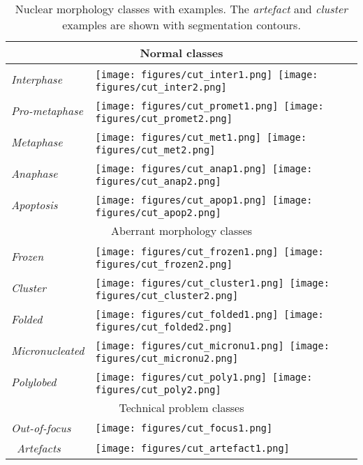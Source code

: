 \begin{table}[!ht]
\caption{Nuclear morphology classes with examples. The \textit{artefact} and \textit{cluster} examples are shown with segmentation contours.}
\label{classexamples}
\begin{tabular}{|ll|}
\hline
\multicolumn{2}{c}{Normal classes}\\
\hline
\textit{Interphase}&\texttt{[image: figures/cut\_inter1.png]}\ \texttt{[image: figures/cut\_inter2.png]}\\
\textit{Pro-metaphase}&\texttt{[image: figures/cut\_promet1.png]}\ \texttt{[image: figures/cut\_promet2.png]}\\
\textit{Metaphase}&\texttt{[image: figures/cut\_met1.png]}\ \texttt{[image: figures/cut\_met2.png]}\\
\textit{Anaphase}&\texttt{[image: figures/cut\_anap1.png]}\ \texttt{[image: figures/cut\_anap2.png]}\\
\textit{Apoptosis}&\texttt{[image: figures/cut\_apop1.png]}\ \texttt{[image: figures/cut\_apop2.png]}\\
\hline
\multicolumn{2}{c}{Aberrant morphology classes}\\
\hline
\textit{Frozen}&\texttt{[image: figures/cut\_frozen1.png]}\ \texttt{[image: figures/cut\_frozen2.png]}\\
\textit{Cluster}&\texttt{[image: figures/cut\_cluster1.png]}\ \texttt{[image: figures/cut\_cluster2.png]}\\
\textit{Folded}&\texttt{[image: figures/cut\_folded1.png]}\ \texttt{[image: figures/cut\_folded2.png]}\\
\textit{Micronucleated}&\texttt{[image: figures/cut\_micronu1.png]}\ \texttt{[image: figures/cut\_micronu2.png]}\\
\textit{Polylobed}&\texttt{[image: figures/cut\_poly1.png]}\ \texttt{[image: figures/cut\_poly2.png]}\\
\hline
\multicolumn{2}{c}{Technical problem classes}\\
\hline
\textit{Out-of-focus}&\texttt{[image: figures/cut\_focus1.png]}\\\
\textit{Artefacts}&\texttt{[image: figures/cut\_artefact1.png]}\\
\hline
\end{tabular}
\end{table}

